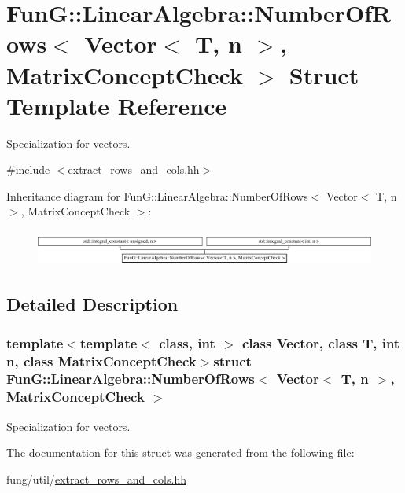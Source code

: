 \hypertarget{structFunG_1_1LinearAlgebra_1_1NumberOfRows_3_01Vector_3_01T_00_01n_01_4_00_01MatrixConceptCheck_01_4}{}\section{Fun\+G\+:\+:Linear\+Algebra\+:\+:Number\+Of\+Rows$<$ Vector$<$ T, n $>$, Matrix\+Concept\+Check $>$ Struct Template Reference}
\label{structFunG_1_1LinearAlgebra_1_1NumberOfRows_3_01Vector_3_01T_00_01n_01_4_00_01MatrixConceptCheck_01_4}


Specialization for vectors.  




{\ttfamily \#include $<$extract\+\_\+rows\+\_\+and\+\_\+cols.\+hh$>$}

Inheritance diagram for Fun\+G\+:\+:Linear\+Algebra\+:\+:Number\+Of\+Rows$<$ Vector$<$ T, n $>$, Matrix\+Concept\+Check $>$\+:\begin{figure}[H]
\begin{center}
\leavevmode
\includegraphics[height=1.196581cm]{structFunG_1_1LinearAlgebra_1_1NumberOfRows_3_01Vector_3_01T_00_01n_01_4_00_01MatrixConceptCheck_01_4}
\end{center}
\end{figure}


\subsection{Detailed Description}
\subsubsection*{template$<$template$<$ class, int $>$ class Vector, class T, int n, class Matrix\+Concept\+Check$>$struct Fun\+G\+::\+Linear\+Algebra\+::\+Number\+Of\+Rows$<$ Vector$<$ T, n $>$, Matrix\+Concept\+Check $>$}

Specialization for vectors. 

The documentation for this struct was generated from the following file\+:\begin{DoxyCompactItemize}
\item 
fung/util/\hyperlink{extract__rows__and__cols_8hh}{extract\+\_\+rows\+\_\+and\+\_\+cols.\+hh}\end{DoxyCompactItemize}
